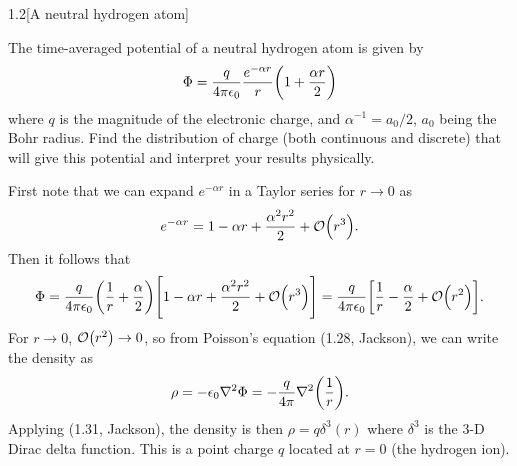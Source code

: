 \documentclass[12pt]{article}
\begin{document}
\begin{problem}{1.2}[A neutral hydrogen atom]

The time-averaged potential of a neutral hydrogen atom is given by
\begin{equation}
    \Phi=\frac{q}{4\pi\epsilon_0}\frac{e^{-\alpha r}}{r}\qty(1+\frac{\alpha
    r}{2}) 
\end{equation}
where $q$ is the magnitude of the electronic charge, and $\alpha^{-1}=a_0/2$,
$a_0$ being the Bohr radius. Find the distribution of charge (both continuous
and discrete) that will give this potential and interpret your results
physically.

\begin{solution}
    First note that we can expand $e^{-\alpha r}$ in a Taylor series for
    $r\to0$ as
    \begin{equation}
        e^{-\alpha r}=1-\alpha r+\frac{\alpha^2r^2}{2}+\order{r^3}.
    \end{equation}
    Then it follows that
    \begin{equation}
        \Phi
        =\frac{q}{4\pi\epsilon_0}\qty(\frac1r+\frac{\alpha}{2})
            \qty[1-\alpha r+\frac{\alpha^2r^2}{2}+\order{r^3}]
        =\frac{q}{4\pi\epsilon_0}\qty[\frac1r-\frac\alpha2+\order{r^2}].
    \end{equation}
    For $r\to0$, $\order{r^2}\to0$, so from Poisson's equation (1.28, Jackson),
    we can write the density as
    \begin{equation}
        \rho=-\epsilon_0\laplacian{\Phi}=-\frac{q}{4\pi}
            \laplacian{\qty(\frac1{r})}.
    \end{equation}
    Applying (1.31, Jackson), the density is then $\rho=q\delta^3(r)$ where
    $\delta^3$ is the 3-D Dirac delta function. This is a point charge $q$ 
    located at $r=0$ (the hydrogen ion).
\end{solution}

\end{problem}
\end{document}

